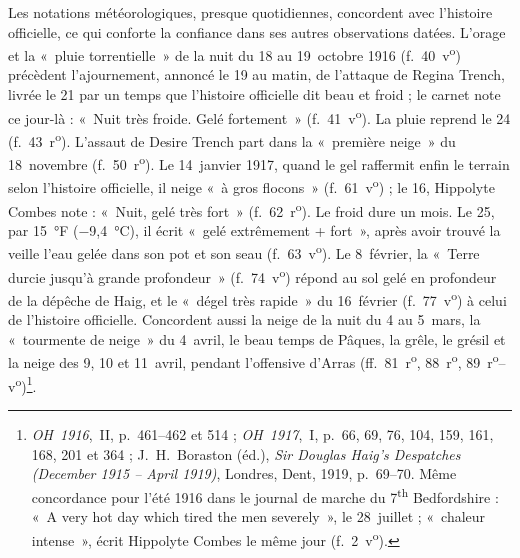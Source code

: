 Les notations météorologiques, presque quotidiennes, concordent avec l'histoire officielle, ce qui conforte la confiance dans ses autres observations datées. L'orage et la «~pluie torrentielle~» de la nuit du 18 au 19~octobre 1916 (f.~40~v\textsuperscript{o}) précèdent l'ajournement, annoncé le 19 au matin, de l'attaque de Regina Trench, livrée le 21 par un temps que l'histoire officielle dit beau et froid ; le carnet note ce jour-là : «~Nuit très froide. Gelé fortement~» (f.~41~v\textsuperscript{o}). La pluie reprend le 24 (f.~43~r\textsuperscript{o}). L'assaut de Desire Trench part dans la «~première neige~» du 18~novembre (f.~50~r\textsuperscript{o}). Le 14~janvier 1917, quand le gel raffermit enfin le terrain selon l'histoire officielle, il neige «~à gros flocons~» (f.~61~v\textsuperscript{o}) ; le 16, Hippolyte Combes note : «~Nuit, gelé très fort~» (f.~62~r\textsuperscript{o}). Le froid dure un mois. Le 25, par 15~°F (−9,4~°C), il écrit «~gelé extrêmement + fort~», après avoir trouvé la veille l'eau gelée dans son pot et son seau (f.~63~v\textsuperscript{o}). Le 8~février, la «~Terre durcie jusqu'à grande profondeur~» (f.~74~v\textsuperscript{o}) répond au sol gelé en profondeur de la dépêche de Haig, et le «~dégel très rapide~» du 16~février (f.~77~v\textsuperscript{o}) à celui de l'histoire officielle. Concordent aussi la neige de la nuit du 4 au 5~mars, la «~tourmente de neige~» du 4~avril, le beau temps de Pâques, la grêle, le grésil et la neige des 9, 10 et 11~avril, pendant l'offensive d'Arras (ff.~81~r\textsuperscript{o}, 88~r\textsuperscript{o}, 89~r\textsuperscript{o}--v\textsuperscript{o})\footnote{\textit{OH~1916},~II, p.~461--462 et 514 ; \textit{OH~1917},~I, p.~66, 69, 76, 104, 159, 161, 168, 201 et 364 ; J.~H.~Boraston (éd.), \textit{Sir Douglas Haig's Despatches (December 1915 -- April 1919)}, Londres, Dent, 1919, p.~69--70. Même concordance pour l'été 1916 dans le journal de marche du 7\textsuperscript{th} Bedfordshire : «~A very hot day which tired the men severely~», le 28~juillet ; «~chaleur intense~», écrit Hippolyte Combes le même jour (f.~2~v\textsuperscript{o}).}.
